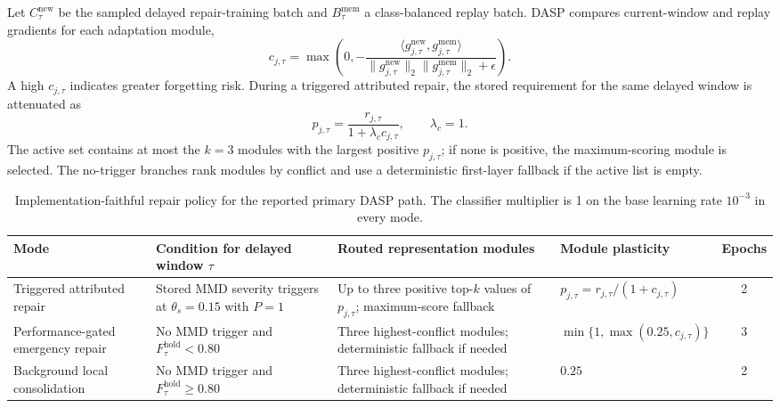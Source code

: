 \documentclass{ieeeaccess}
\begin{document}
Let $C_{\tau}^{\mathrm{new}}$ be the sampled delayed repair-training batch and $B_{\tau}^{\mathrm{mem}}$ a class-balanced replay batch. DASP compares current-window and replay gradients for each adaptation module,
\begin{equation}
c_{j,\tau}=\max\left(0,-\frac{\langle g_{j,\tau}^{\mathrm{new}},g_{j,\tau}^{\mathrm{mem}}\rangle}
{\lVert g_{j,\tau}^{\mathrm{new}}\rVert_2\lVert g_{j,\tau}^{\mathrm{mem}}\rVert_2+\epsilon}\right).
\label{eq:conflict}
\end{equation}
A high $c_{j,\tau}$ indicates greater forgetting risk. During a triggered attributed repair, the stored requirement for the same delayed window is attenuated as
\begin{equation}
p_{j,\tau}=\frac{r_{j,\tau}}{1+\lambda_c c_{j,\tau}},\qquad \lambda_c=1.
\label{eq:attribution}
\end{equation}
The active set contains at most the $k=3$ modules with the largest positive $p_{j,\tau}$; if none is positive, the maximum-scoring module is selected. The no-trigger branches rank modules by conflict and use a deterministic first-layer fallback if the active list is empty.

\begin{table}[t]
\caption{Implementation-faithful repair policy for the reported primary DASP path. The classifier multiplier is 1 on the base learning rate $10^{-3}$ in every mode.}
\label{tab:dasp-repair-policy}
\centering
\scriptsize
\begin{tabular}{p{}p{}p{}p{}c}
\toprule
Mode & Condition for delayed window $\tau$ & Routed representation modules & Module plasticity & Epochs\\
\midrule
Triggered attributed repair & Stored MMD severity triggers at $\theta_s=0.15$ with $P=1$ & Up to three positive top-$k$ values of $p_{j,\tau}$; maximum-score fallback & $p_{j,\tau}=r_{j,\tau}/(1+c_{j,\tau})$ & 2\\
Performance-gated emergency repair & No MMD trigger and $F^{\mathrm{hold}}_{\tau}<0.80$ & Three highest-conflict modules; deterministic fallback if needed & $\min\{1,\max(0.25,c_{j,\tau})\}$ & 3\\
Background local consolidation & No MMD trigger and $F^{\mathrm{hold}}_{\tau}\geq0.80$ & Three highest-conflict modules; deterministic fallback if needed & $0.25$ & 2\\
\bottomrule
\end{tabular}
\end{table}
\end{document}
